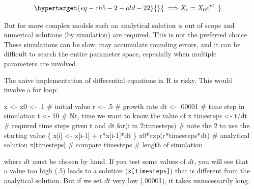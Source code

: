 \documentclass[
  letterpaper,
]{scrbook}
\newenvironment{Shaded}{\begin{snugshade}}{\end{snugshade}}
\newcommand{\CommentTok}[1]{\textcolor[rgb]{0.37,0.37,0.37}{#1}}
\newcommand{\ControlFlowTok}[1]{\textcolor[rgb]{0.00,0.23,0.31}{#1}}
\newcommand{\DecValTok}[1]{\textcolor[rgb]{0.68,0.00,0.00}{#1}}
\newcommand{\FunctionTok}[1]{\textcolor[rgb]{0.28,0.35,0.67}{#1}}
\newcommand{\NormalTok}[1]{\textcolor[rgb]{0.00,0.23,0.31}{#1}}
\newcommand{\OtherTok}[1]{\textcolor[rgb]{0.00,0.23,0.31}{#1}}
\newcommand{\SpecialCharTok}[1]{\textcolor[rgb]{0.37,0.37,0.37}{#1}}
\begin{document}
\begin{equation}\protect\hypertarget{eq-ch5-2-old-22}{}{\begin{array}{r}
 \Longrightarrow X_{t} = {X_{0}e}^{rt}
\end{array}}\label{eq-ch5-2-old-22}\end{equation}

But for more complex models such an analytical solution is out of scope
and numerical solutions (by simulation) are required. This is not the
preferred choice. These simulations can be slow, may accumulate rounding
errors, and it can be difficult to search the entire parameter space,
especially when multiple parameters are involved.

The naive implementation of differential equations in R is risky. This
would involve a for loop:

\begin{Shaded}
\begin{Highlighting}[]
\NormalTok{x }\OtherTok{\textless{}{-}}\NormalTok{ x0 }\OtherTok{\textless{}{-}}\NormalTok{ .}\DecValTok{1}  \CommentTok{\# initial value}
\NormalTok{r }\OtherTok{\textless{}{-}}\NormalTok{ .}\DecValTok{5} \CommentTok{\# growth rate}
\NormalTok{dt }\OtherTok{\textless{}{-}}\NormalTok{ .}\DecValTok{00001} \CommentTok{\# time step in simulation}
\NormalTok{t }\OtherTok{\textless{}{-}} \DecValTok{10}  \CommentTok{\# Nt, time we want to know the value of x}
\NormalTok{timesteps }\OtherTok{\textless{}{-}}\NormalTok{ t}\SpecialCharTok{/}\NormalTok{dt }\CommentTok{\# required time steps given t and dt}
\ControlFlowTok{for}\NormalTok{(i }\ControlFlowTok{in} \DecValTok{2}\SpecialCharTok{:}\NormalTok{timesteps) }\CommentTok{\# note the 2 to use the starting value}
\NormalTok{\{}
\NormalTok{  x[i] }\OtherTok{\textless{}{-}}\NormalTok{ x[i}\DecValTok{{-}1}\NormalTok{] }\SpecialCharTok{+}\NormalTok{ r}\SpecialCharTok{*}\NormalTok{x[i}\DecValTok{{-}1}\NormalTok{]}\SpecialCharTok{*}\NormalTok{dt}
\NormalTok{\}}
\NormalTok{x0}\SpecialCharTok{*}\FunctionTok{exp}\NormalTok{(r}\SpecialCharTok{*}\NormalTok{timesteps}\SpecialCharTok{*}\NormalTok{dt) }\CommentTok{\# analytical solution}
\NormalTok{x[timesteps] }\CommentTok{\# compare}
\NormalTok{timesteps }\CommentTok{\# length of simulation}
\end{Highlighting}
\end{Shaded}

where \(dt\) must be chosen by hand. If you test some values of \(dt\),
you will see that a value too high (.5) leads to a solution
(\texttt{x{[}timesteps{]}}) that is different from the analytical
solution. But if we set \(dt\) very low (.00001), it takes unnecessarily
long.
\end{document}
